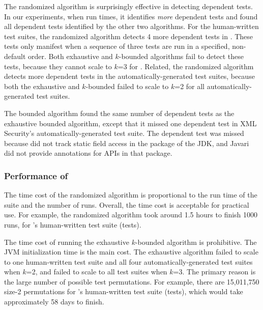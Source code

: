 The randomized algorithm is surprisingly effective in
detecting dependent tests. In our experiments, when run \trialnum times,
it identifies \textit{more} dependent tests and found all
dependent tests identified by the other two algorithms.
For the human-written
test suites, the randomized algorithm detects 4 more dependent
tests in \jt. These tests only
manifest when a sequence of three tests are run in a specified,
non-default order. Both exhaustive and \dependenceaware{} $k$-bounded
algorithms fail to detect these tests, because
they cannot scale to $k$=3 for 
\jt. Related, the randomized algorithm
detects more dependent
tests in the automatically-generated test suites,
because both the exhaustive and \dependenceaware{} $k$-bounded
failed to scale to $k$=2 for all automatically-generated test suites.

The \dependenceaware{} bounded algorithm found the same
number of dependent tests as the exhaustive bounded algorithm, except
that it missed one dependent test in XML Security's
automatically-generated test suite.
The dependent test was missed because \ourtool
did not track static field access in the  package
of the JDK, and Javari did not provide annotations for APIs
in that package.


\subsubsection{Performance of \ourtool}
\label{sec:performance}

The time cost of the randomized algorithm 
is proportional to the run time of the suite and the number of runs.
Overall, the time cost is acceptable for practical use.
For example, the randomized algorithm took around 1.5 hours
to finish 1000 runs,  for \jt's human-written test
suite (\jodatimetests tests).
 
The time cost of running the exhaustive $k$-bounded algorithm
is prohibitive. The JVM initialization time is the main cost.
The exhaustive algorithm failed to
scale to one human-written test suite and all four automatically-generated
test suites when $k$=2, and failed to scale to all test suites
when $k$=3. The primary reason is the large
number of possible test permutations. 
For example, there are 15,011,750 size-2 permutations
for \jt's human-written test suite (\jodatimetests tests),
which would take approximately 58 days to finish.

